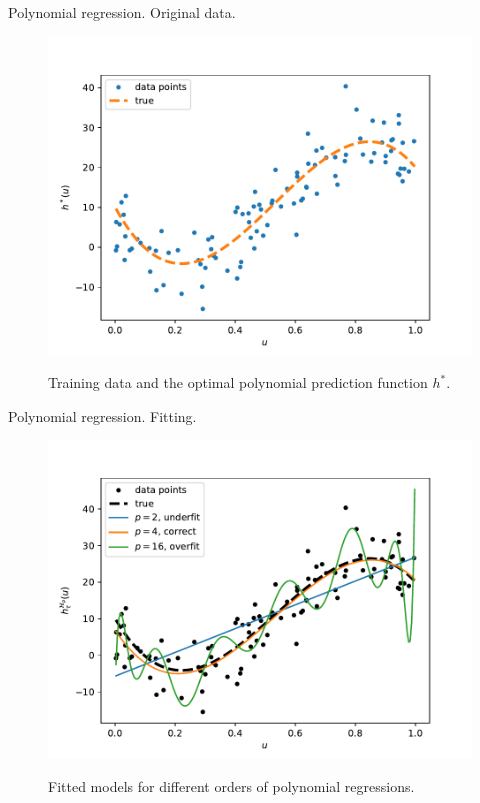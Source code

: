 \documentclass{beamer}
\begin{document}
\begin{frame}{Polynomial regression. Original data.}
  \begin{figure}
    \includegraphics[width=0.7\linewidth]{polydatpy}
    \label{fig:polydatpy}
    \caption{Training data and the optimal polynomial prediction function $h^*$\cite{kroese2020}.}
  \end{figure}
\end{frame}

\begin{frame}{Polynomial regression. Fitting.}
  \begin{figure}
    \includegraphics[width=0.7\linewidth]{polyfitpy}
    \label{fig:polydatpy}
    \caption{Fitted models for different orders of polynomial regressions\cite{kroese2020}.}
  \end{figure}
\end{frame}
\end{document}
